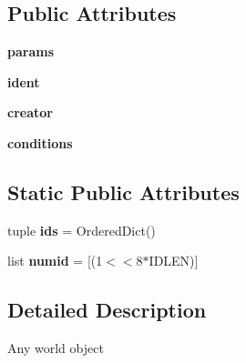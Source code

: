 \subsection*{\-Public \-Attributes}
\begin{DoxyCompactItemize}
\item 
\hypertarget{classshared_1_1world_1_1_object_a256a43b2759700fb202885f3534f495e}{{\bfseries params}}\label{classshared_1_1world_1_1_object_a256a43b2759700fb202885f3534f495e}

\item 
\hypertarget{classshared_1_1world_1_1_object_a3b5b2d455aad290fe95083265b0136c2}{{\bfseries ident}}\label{classshared_1_1world_1_1_object_a3b5b2d455aad290fe95083265b0136c2}

\item 
\hypertarget{classshared_1_1world_1_1_object_ac4bfd3818afde4d860d628961331efd5}{{\bfseries creator}}\label{classshared_1_1world_1_1_object_ac4bfd3818afde4d860d628961331efd5}

\item 
\hypertarget{classshared_1_1world_1_1_object_a00f3ae7006ae35a63f76da458006dcfc}{{\bfseries conditions}}\label{classshared_1_1world_1_1_object_a00f3ae7006ae35a63f76da458006dcfc}

\end{DoxyCompactItemize}
\subsection*{\-Static \-Public \-Attributes}
\begin{DoxyCompactItemize}
\item 
\hypertarget{classshared_1_1world_1_1_object_a80060d96fee6fb75f2d1679dae5ba4dd}{tuple {\bfseries ids} = \-Ordered\-Dict()}\label{classshared_1_1world_1_1_object_a80060d96fee6fb75f2d1679dae5ba4dd}

\item 
\hypertarget{classshared_1_1world_1_1_object_a7e11295871456b2ee53b0ce086c0ddf3}{list {\bfseries numid} = \mbox{[}(1$<$$<$8$\ast$\-I\-D\-L\-E\-N)\mbox{]}}\label{classshared_1_1world_1_1_object_a7e11295871456b2ee53b0ce086c0ddf3}

\end{DoxyCompactItemize}


\subsection{\-Detailed \-Description}
\begin{DoxyVerb}Any world object \end{DoxyVerb}
 

